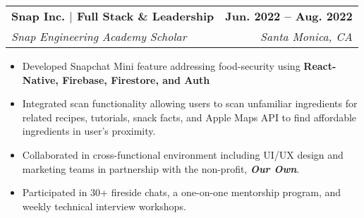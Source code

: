 \documentclass[letterpaper,11pt]{article}
\makeatletter
\newcommand{\resumeItem}[1]{
  \item\small{
    {#1 \vspace{-2pt}}
  }
}
\newcommand{\resumeSubheading}[4]{
  \vspace{-2pt}\item
    \begin{tabular*}{1.0\textwidth}[t]{l@{\extracolsep{\fill}}r}
      \textbf{#1} & \textbf{\small #2} \\
      \textit{\small#3} & \textit{\small #4} \\
    \end{tabular*}\vspace{-7pt}
}
\newcommand{\resumeItemListStart}{\begin{itemize}}
\newcommand{\resumeItemListEnd}{\end{itemize}\vspace{-5pt}}
\makeatother
\begin{document}
\resumeSubheading
{Snap Inc. $|$ Full Stack \& Leadership}{ Jun. 2022 -- Aug. 2022}
{Snap Engineering Academy Scholar}{Santa Monica, CA}
\resumeItemListStart
\resumeItem {
Developed Snapchat Mini feature addressing food-security using \textbf{React-Native, Firebase, Firestore, and Auth}}
\resumeItem{ Integrated scan functionality allowing users to scan unfamiliar ingredients for related recipes, tutorials, snack facts, and Apple Maps API to find affordable ingredients in user's proximity.}
\resumeItem{
Collaborated in cross-functional environment including UI/UX design and marketing teams in partnership with the non-profit, \textbf{\textit{Our Own}}. }
\resumeItem{ Participated in 30+ fireside chats, a one-on-one mentorship program, and weekly technical interview workshops.}
\resumeItemListEnd






\end{document}
